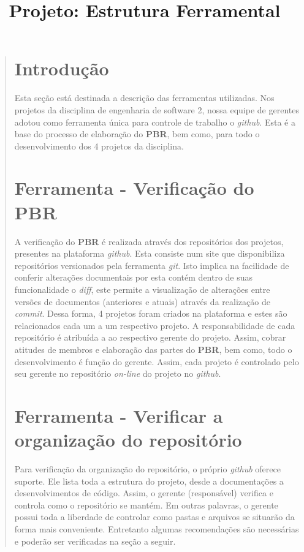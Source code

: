 \documentclass[12pt,a4paper,final]{report}
\title{Projeto: Estrutura Ferramental}
\begin{document}
	\maketitle
	\begin{quotation}
		\section*{Introdução}
		\quad Esta seção está destinada a descrição das ferramentas utilizadas. Nos projetos  da disciplina de engenharia de software 2, nossa equipe de gerentes adotou como ferramenta única para controle  de trabalho o \textit{github}. Esta é a base do processo de elaboração do \textbf{PBR}, bem como, para todo o desenvolvimento dos 4 projetos da disciplina. 
		
		\section*{Ferramenta - Verificação do PBR}
	\quad	A verificação do \textbf{PBR} é realizada através dos repositórios dos projetos, presentes na plataforma \textit{github}. Esta consiste num site que disponibiliza repositórios versionados pela ferramenta \textit{git}. Isto implica na facilidade de conferir alterações documentais por esta contém dentro de suas funcionalidade o \textit{diff}, este permite a visualização de alterações entre versões de documentos (anteriores e atuais) através da realização de \textit{commit}.
		Dessa forma, 4 projetos foram criados na plataforma e estes são relacionados cada um a um respectivo projeto. A responsabilidade de cada repositório é atribuída a ao respectivo gerente do projeto. Assim, cobrar atitudes de membros e elaboração das partes do \textbf{PBR}, bem como, todo o desenvolvimento é função do gerente.
		Assim, cada projeto é controlado pelo seu gerente no repositório \textit{on-line} do projeto no \textit{github}.
	\section*{Ferramenta - Verificar a organização do repositório}
	\quad Para verificação da organização do repositório, o próprio \textit{github} oferece suporte. Ele lista toda a estrutura do projeto, desde a documentações a desenvolvimentos de código. Assim, o gerente (responsável) verifica e controla como o repositório se mantém. Em outras palavras, o gerente possui toda a liberdade de controlar como pastas e arquivos se situarão da forma mais conveniente.
	\quad Entretanto algumas recomendações são necessárias e poderão ser verificadas na seção a seguir.

\end{quotation}
\end{document}
